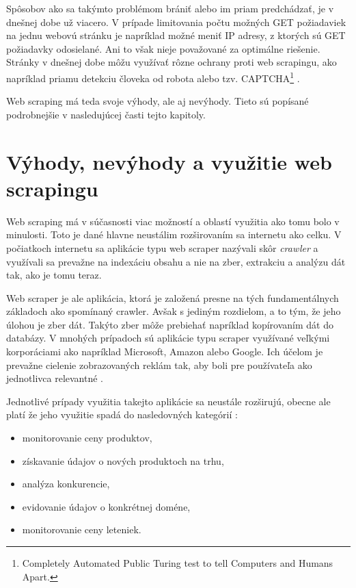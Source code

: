 Spôsobov ako sa takýmto problémom brániť alebo im priam predchádzať, je v dnešnej dobe už viacero. V prípade limitovania počtu možných GET požiadaviek na jednu webovú stránku je napríklad možné meniť IP adresy, z ktorých sú GET požiadavky odosielané. Ani to však nieje považované za optimálne riešenie. Stránky v dnešnej dobe môžu využívať rôzne ochrany proti web scrapingu, ako napríklad priamu detekciu človeka od robota alebo tzv. CAPTCHA\footnote{Completely Automated Public Turing test to tell Computers and Humans Apart.} \cite{JanCurna:online} .

Web scraping má teda svoje výhody, ale aj nevýhody. Tieto sú popísané podrobnejšie v nasledujúcej časti tejto kapitoly.

\section{Výhody, nevýhody a využitie web scrapingu}

Web scraping má v súčasnosti viac možností a oblastí využitia ako tomu bolo v minulosti. Toto je dané hlavne neustálim rozširovaním sa internetu ako celku. V počiatkoch internetu sa aplikácie typu web scraper nazývali skôr \textit{crawler} a využívali sa prevažne na indexáciu obsahu a nie na zber, extrakciu a analýzu dát tak, ako je tomu teraz. 

Web scraper je ale aplikácia, ktorá je založená presne na tých fundamentálnych základoch ako spomínaný crawler. Avšak s jediným rozdielom, a to tým, že jeho úlohou je zber dát. Takýto zber môže prebiehať napríklad kopírovaním dát do databázy. V mnohých prípadoch sú aplikácie typu scraper využívané veľkými korporáciami ako napríklad Microsoft, Amazon alebo Google. Ich účelom je prevažne cielenie zobrazovaných reklám tak, aby boli pre používateľa ako jednotlivca relevantné \cite{online:how_does_scraping_work}.

\bigskip

Jednotlivé prípady využitia takejto aplikácie sa neustále rozširujú, obecne ale platí že jeho využitie spadá do nasledovných kategórií \cite{WebScrap}:

\begin{itemize}
    \item monitorovanie ceny produktov,
    \item získavanie údajov o nových produktoch na trhu,
    \item analýza konkurencie,
    \item evidovanie údajov o konkrétnej doméne,
    \item monitorovanie ceny leteniek.
\end{itemize}

